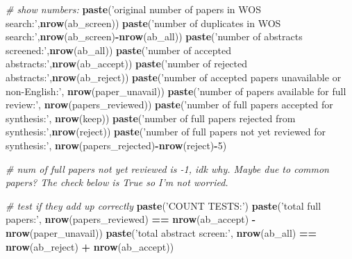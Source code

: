 \documentclass[
]{article}
\newenvironment{Shaded}{\begin{snugshade}}{\end{snugshade}}
\newcommand{\CommentTok}[1]{\textcolor[rgb]{0.56,0.35,0.01}{\textit{#1}}}
\newcommand{\DecValTok}[1]{\textcolor[rgb]{0.00,0.00,0.81}{#1}}
\newcommand{\KeywordTok}[1]{\textcolor[rgb]{0.13,0.29,0.53}{\textbf{#1}}}
\newcommand{\NormalTok}[1]{#1}
\newcommand{\OperatorTok}[1]{\textcolor[rgb]{0.81,0.36,0.00}{\textbf{#1}}}
\newcommand{\StringTok}[1]{\textcolor[rgb]{0.31,0.60,0.02}{#1}}
\begin{document}
\begin{Shaded}
\begin{Highlighting}[]
\CommentTok{# show numbers:}
  \KeywordTok{paste}\NormalTok{(}\StringTok{'original number of papers in WOS search:'}\NormalTok{,}\KeywordTok{nrow}\NormalTok{(ab_screen))}
  \KeywordTok{paste}\NormalTok{(}\StringTok{'number of duplicates in WOS search:'}\NormalTok{,}\KeywordTok{nrow}\NormalTok{(ab_screen)}\OperatorTok{-}\KeywordTok{nrow}\NormalTok{(ab_all))}
  \KeywordTok{paste}\NormalTok{(}\StringTok{'number of abstracts screened:'}\NormalTok{,}\KeywordTok{nrow}\NormalTok{(ab_all))}
  \KeywordTok{paste}\NormalTok{(}\StringTok{'number of accepted abstracts:'}\NormalTok{,}\KeywordTok{nrow}\NormalTok{(ab_accept))}
  \KeywordTok{paste}\NormalTok{(}\StringTok{'number of rejected abstracts:'}\NormalTok{,}\KeywordTok{nrow}\NormalTok{(ab_reject))}
  \KeywordTok{paste}\NormalTok{(}\StringTok{'number of accepted papers unavailable or non-English:'}\NormalTok{,}
        \KeywordTok{nrow}\NormalTok{(paper_unavail))}
  \KeywordTok{paste}\NormalTok{(}\StringTok{'number of papers available for full review:'}\NormalTok{,}
        \KeywordTok{nrow}\NormalTok{(papers_reviewed))}
  \KeywordTok{paste}\NormalTok{(}\StringTok{'number of full papers accepted for synthesis:'}\NormalTok{,}
        \KeywordTok{nrow}\NormalTok{(keep)) }
  \KeywordTok{paste}\NormalTok{(}\StringTok{'number of full papers rejected from synthesis:'}\NormalTok{,}\KeywordTok{nrow}\NormalTok{(reject))}
  \KeywordTok{paste}\NormalTok{(}\StringTok{'number of full papers not yet reviewed for synthesis:'}\NormalTok{,}
        \KeywordTok{nrow}\NormalTok{(papers_rejected)}\OperatorTok{-}\KeywordTok{nrow}\NormalTok{(reject)}\OperatorTok{-}\DecValTok{5}\NormalTok{)}
  
\CommentTok{# num of full papers not yet reviewed is -1, idk why. Maybe due to common papers? The check below is True so I'm not worried.    }
  
  
\CommentTok{# test if they add up correctly}
  \KeywordTok{paste}\NormalTok{(}\StringTok{'COUNT TESTS:'}\NormalTok{)}
  \KeywordTok{paste}\NormalTok{(}\StringTok{'total full papers:'}\NormalTok{,}
        \KeywordTok{nrow}\NormalTok{(papers_reviewed) }\OperatorTok{==}\StringTok{ }\KeywordTok{nrow}\NormalTok{(ab_accept) }\OperatorTok{-}\StringTok{ }\KeywordTok{nrow}\NormalTok{(paper_unavail))}
  \KeywordTok{paste}\NormalTok{(}\StringTok{'total abstract screen:'}\NormalTok{,}
        \KeywordTok{nrow}\NormalTok{(ab_all) }\OperatorTok{==}\StringTok{ }\KeywordTok{nrow}\NormalTok{(ab_reject) }\OperatorTok{+}\StringTok{ }\KeywordTok{nrow}\NormalTok{(ab_accept))}
\end{Highlighting}
\end{Shaded}
\end{document}
